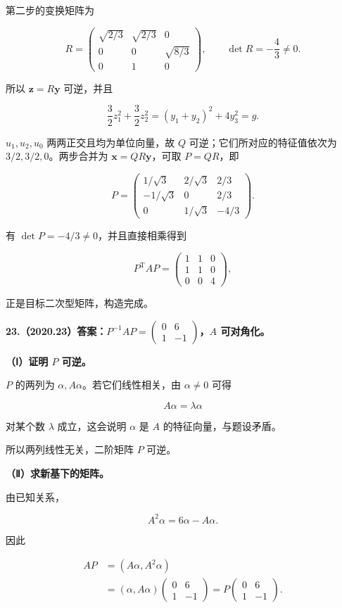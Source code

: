\documentclass[UTF8,11pt,fontset=windows]{ctexart}
\begin{document}
第二步的变换矩阵为

$$
R=\begin{pmatrix}\sqrt{2/3}&\sqrt{2/3}&0\\0&0&\sqrt{8/3}\\0&1&0\end{pmatrix},
\qquad \det R=-\frac43\ne0.
$$

所以 $\boldsymbol z=R\boldsymbol y$ 可逆，并且

$$
\frac32z_1^2+\frac32z_2^2=(y_1+y_2)^2+4y_3^2=g.
$$

$u_1,u_2,u_0$ 两两正交且均为单位向量，故 $Q$ 可逆；它们所对应的特征值依次为 $3/2,3/2,0$。两步合并为 $\boldsymbol x=QR\boldsymbol y$，可取 $P=QR$，即

$$
P=\begin{pmatrix}
1/\sqrt3&2/\sqrt3&2/3\\
-1/\sqrt3&0&2/3\\
0&1/\sqrt3&-4/3
\end{pmatrix}.
$$

有 $\det P=-4/3\ne0$，并且直接相乘得到

$$
P^{\mathrm T}AP=\begin{pmatrix}1&1&0\\1&1&0\\0&0&4\end{pmatrix},
$$

正是目标二次型矩阵，构造完成。

\clearpage

\textbf{23.（2020.23）答案：$P^{-1}AP=\begin{pmatrix}0&6\\1&-1\end{pmatrix}$，$A$ 可对角化。}

\textbf{（Ⅰ）证明 $P$ 可逆。}

$P$ 的两列为 $\alpha,A\alpha$。若它们线性相关，由 $\alpha\ne0$ 可得

$$
A\alpha=\lambda\alpha
$$

对某个数 $\lambda$ 成立，这会说明 $\alpha$ 是 $A$ 的特征向量，与题设矛盾。

所以两列线性无关，二阶矩阵 $P$ 可逆。

\textbf{（Ⅱ）求新基下的矩阵。}

由已知关系，

$$
A^2\alpha=6\alpha-A\alpha.
$$

因此

$$
\begin{aligned}
AP&=(A\alpha,A^2\alpha)\\
&=(\alpha,A\alpha)\begin{pmatrix}0&6\\1&-1\end{pmatrix}
=P\begin{pmatrix}0&6\\1&-1\end{pmatrix}.
\end{aligned}
$$
\end{document}
